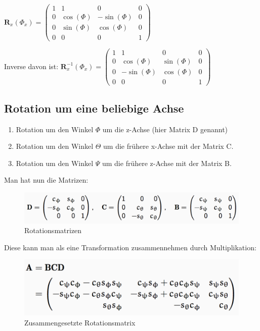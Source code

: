 $\textbf{R}_x(\Phi_x) = \begin{pmatrix}
1 & 1 & 0 & 0\\
0 & \cos (\Phi)  & -\sin (\Phi) & 0\\
0 & \sin (\Phi) & \cos (\Phi) & 0\\
0 & 0 & 0 & 1
\end{pmatrix}$

Inverse davon ist:
$\textbf{R}_x^{-1}(\Phi_x) = \begin{pmatrix}
1 & 1 & 0 & 0\\
0 & \cos (\Phi)  & \sin (\Phi) & 0\\
0 & -\sin (\Phi) & \cos (\Phi) & 0\\
0 & 0 & 0 & 1
\end{pmatrix}$

\subsection{Rotation um eine beliebige Achse}
\begin{enumerate}
\item Rotation um den Winkel $\Phi$ um die z-Achse (hier Matrix D genannt)
\item Rotation um den Winkel $\Theta$ um die frühere x-Achse mit der Matrix C.
\item Rotation um den Winkel $\Psi$ um die frühere z-Achse mit der Matrix B.
\end{enumerate}

Man hat nun die Matrizen:
\begin{figure}[!ht]
	\centering
	\includegraphics[width=0.7\linewidth]{fig/Rotation_um_bel_Achse.png}
	\caption{Rotationsmatrizen}
	\label{fig:spatprodukt}
\end{figure}

Diese kann man als eine Transformation zusammennehmen durch Multiplikation:
\begin{figure}[!ht]
	\centering
	\includegraphics[width=0.7\linewidth]{fig/Zusammengesetzte_Rotationsmatrix.png}
	\caption{Zusammengesetzte Rotationsmatrix}
	\label{fig:spatprodukt}
\end{figure}

